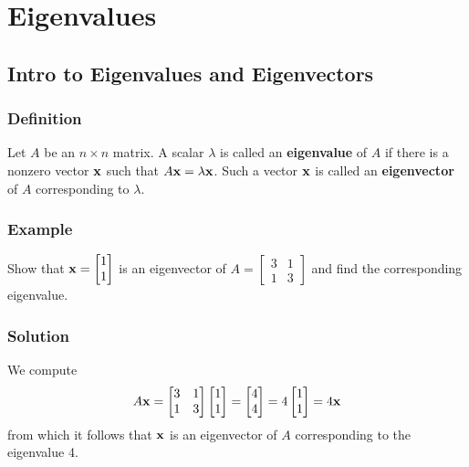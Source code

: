 \chapter{Eigenvalues}

\section{Intro to Eigenvalues and Eigenvectors}

\subsection*{Definition}
Let $A$ be an $n\times n$ matrix. A scalar $\lambda$ is called an \textbf{eigenvalue}
of $A$ if there is a nonzero vector $\mathbf{x}$ such that $A\mathbf{x}=\lambda\mathbf{x}$. Such a vector
$\mathbf{x}$ is called an \textbf{eigenvector} of $A$ corresponding to $\lambda$.

\subsection*{Example}
Show that $\mathbf{x}=\begin{bmatrix}
        1 \\1
    \end{bmatrix}$ is an eigenvector of $A=\begin{bmatrix}
        3 & 1 \\
        1 & 3
    \end{bmatrix}$ and find the corresponding eigenvalue.

\subsection*{Solution}
We compute
\[
    A\mathbf{x}=\begin{bmatrix}
        3 & 1 \\
        1 & 3
    \end{bmatrix}\begin{bmatrix}
        1 \\1
    \end{bmatrix}=\begin{bmatrix}
        4 \\4
    \end{bmatrix}=4\begin{bmatrix}
        1 \\1
    \end{bmatrix}=4\mathbf{x}
\]
from which it follows that $\mathbf{x}$ is an eigenvector of $A$ corresponding to the eigenvalue 4.


